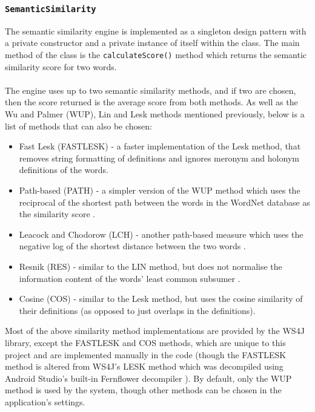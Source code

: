 \documentclass[11pt]{article}
\begin{document}
\subsubsection{\texttt{SemanticSimilarity}}
\label{section:semantic-impl}

The semantic similarity engine is implemented as a singleton design pattern with a private constructor and a private instance of itself within the class. The main method of the class is the \texttt{calculateScore()} method which returns the semantic similarity score for two words.
\\
\\
The engine uses up to two semantic similarity methods, and if two are chosen, then the score returned is the average score from both methods. As well as the Wu and Palmer (WUP), Lin and Lesk methods mentioned previously, below is a list of methods that can also be chosen: 

\begin{itemize}
\item Fast Lesk (FASTLESK) - a faster implementation of the Lesk method, that removes string formatting of definitions and ignores meronym and holonym definitions of the words.

\item Path-based (PATH) - a simpler version of the WUP method which uses the reciprocal of the shortest path between the words in the WordNet database as the similarity score \cite{RefWorks:46}.

\item Leacock and Chodorow (LCH) - another path-based measure which uses the negative log of the shortest distance between the two words \cite{RefWorks:46}.

\item Resnik (RES) - similar to the LIN method, but does not normalise the information content of the words' least common subsumer \cite{RefWorks:46}.

\item Cosine (COS) - similar to the Lesk method, but uses the cosine similarity of their definitions (as opposed to just overlaps in the definitions).
\end{itemize}

Most of the above similarity method implementations are provided by the WS4J library, except the FASTLESK and COS methods, which are unique to this project and are implemented manually in the code (though the FASTLESK method is altered from WS4J's LESK method which was decompiled using Android Studio's built-in Fernflower decompiler \cite{RefWorks:124}). By default, only the WUP method is used by the system, though other methods can be chosen in the application's settings.
\end{document}
